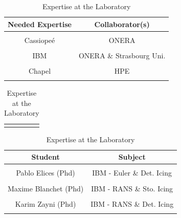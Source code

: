 
\begin{table}[htp!]
\centering
\caption{Expertise at the Laboratory}
\label{tab:expertise}
\begin{tabular}{|c|c|}
\hline
Needed Expertise & Collaborator(s) \\
\hline
&\\
Cassiopeé & ONERA\\ 
& \\
IBM & ONERA \& Strasbourg Uni.\\ 
& \\
Chapel & HPE\\ 
& \\
\hline
\end{tabular}

\begin{tabular}{cc}
& \\
\end{tabular}

\begin{tabular}{|c|c|}
\hline
Student & Subject \\
\hline
&\\
Pablo Elices (Phd) & IBM - Euler \& Det. Icing \\ 
& \\
 Maxime Blanchet (Phd) & IBM - RANS \& Sto. Icing \\ 
& \\
Karim Zayni (Phd) & IBM - RANS \& Det. Icing \\ 
& \\
\hline
\end{tabular}
\end{table}
